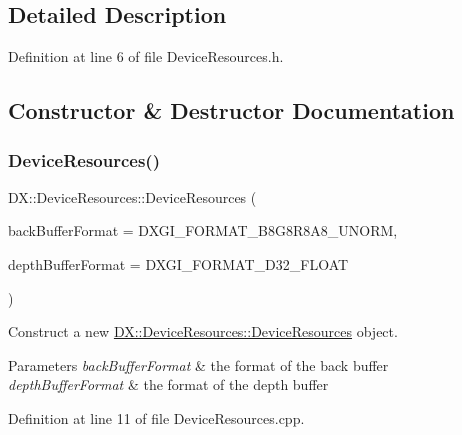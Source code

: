 \subsection{Detailed Description}


Definition at line 6 of file Device\+Resources.\+h.



\subsection{Constructor \& Destructor Documentation}
\mbox{\label{class_d_x_1_1_device_resources_a78141267b73a601408bf12f5090b25ca}} 
\subsubsection{\texorpdfstring{Device\+Resources()}{DeviceResources()}}
{\footnotesize\ttfamily D\+X\+::\+Device\+Resources\+::\+Device\+Resources (\begin{DoxyParamCaption}\item[{D\+X\+G\+I\+\_\+\+F\+O\+R\+M\+AT}]{back\+Buffer\+Format = {\ttfamily DXGI\+\_\+FORMAT\+\_\+B8G8R8A8\+\_\+UNORM},  }\item[{D\+X\+G\+I\+\_\+\+F\+O\+R\+M\+AT}]{depth\+Buffer\+Format = {\ttfamily DXGI\+\_\+FORMAT\+\_\+D32\+\_\+FLOAT} }\end{DoxyParamCaption})}



Construct a new \mbox{\hyperlink{class_d_x_1_1_device_resources_a78141267b73a601408bf12f5090b25ca}{D\+X\+::\+Device\+Resources\+::\+Device\+Resources}} object. 


\begin{DoxyParams}{Parameters}
{\em back\+Buffer\+Format} & the format of the back buffer \\
\hline
{\em depth\+Buffer\+Format} & the format of the depth buffer \\
\hline
\end{DoxyParams}


Definition at line 11 of file Device\+Resources.\+cpp.


